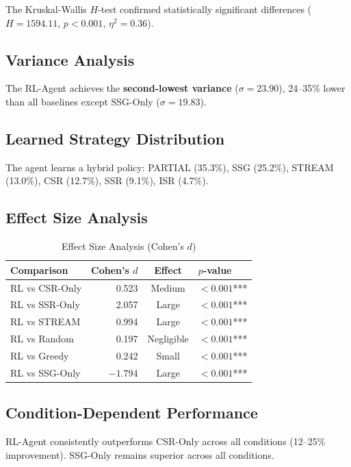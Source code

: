 \documentclass[10pt,twocolumn]{article}
\begin{document}
The Kruskal-Wallis $H$-test confirmed statistically significant differences ($H = 1594.11$, $p < 0.001$, $\eta^2 = 0.36$).

\subsection{Variance Analysis}

The RL-Agent achieves the \textbf{second-lowest variance} ($\sigma = 23.90$), 24--35\% lower than all baselines except SSG-Only ($\sigma = 19.83$).

\subsection{Learned Strategy Distribution}

The agent learns a hybrid policy: PARTIAL (35.3\%), SSG (25.2\%), STREAM (13.0\%), CSR (12.7\%), SSR (9.1\%), ISR (4.7\%).

\subsection{Effect Size Analysis}

\begin{table}[t]
\centering
\caption{Effect Size Analysis (Cohen's $d$)}
\label{tab:effects}
\small
\begin{tabular}{lrcl}
\toprule
\textbf{Comparison} & \textbf{Cohen's $d$} & \textbf{Effect} & \textbf{$p$-value} \\
\midrule
RL vs CSR-Only & 0.523 & Medium & $<0.001$*** \\
RL vs SSR-Only & 2.057 & Large & $<0.001$*** \\
RL vs STREAM & 0.994 & Large & $<0.001$*** \\
RL vs Random & 0.197 & Negligible & $<0.001$*** \\
RL vs Greedy & 0.242 & Small & $<0.001$*** \\
RL vs SSG-Only & $-1.794$ & Large & $<0.001$*** \\
\bottomrule
\end{tabular}
\end{table}

\subsection{Condition-Dependent Performance}

RL-Agent consistently outperforms CSR-Only across all conditions (12--25\% improvement). SSG-Only remains superior across all conditions.
\end{document}
